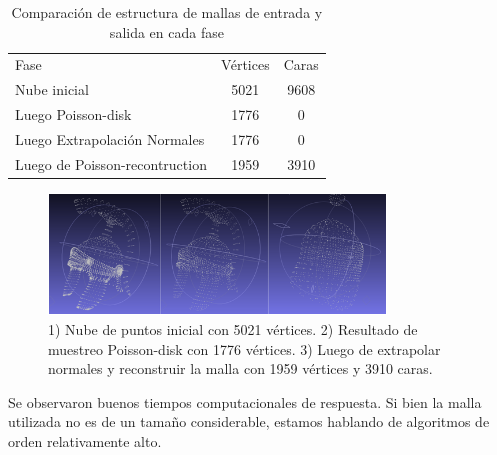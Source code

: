 \begin{table}
\begin{center}
\begin{tabular}{|l||cc|} \hline
	Fase & Vértices & Caras \\
	Nube inicial & 5021 & 9608 \\
	Luego Poisson-disk & 1776 & 0 \\
	Luego Extrapolación Normales & 1776 & 0 \\
	Luego de Poisson-recontruction & 1959 & 3910 \\ \hline
\end{tabular}
\caption{Comparación de estructura de mallas de entrada y salida en cada fase}
\end{center}
\end{table}

\begin{figure}[H]
  \centering
    \includegraphics[width=0.8\textwidth]{./Cap6_reconstruccion/malla-nubepuntos.png}
  \caption{1) Nube de puntos inicial con 5021 vértices. 2) Resultado de muestreo Poisson-disk con 1776 vértices. 3) Luego de extrapolar normales y reconstruir la malla con 1959 vértices y 3910 caras.}
  \label{fig:Mesh-Results}
\end{figure}
 
Se observaron buenos tiempos computacionales de respuesta. Si bien la malla utilizada no es de un tamaño considerable, estamos hablando de algoritmos de orden relativamente alto.
